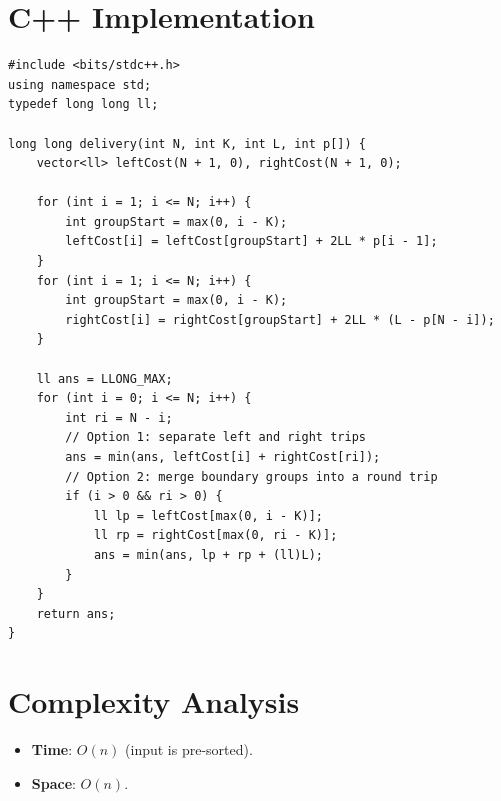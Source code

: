 \documentclass[11pt,a4paper]{article}
\begin{document}
\section{C++ Implementation}

\begin{lstlisting}
#include <bits/stdc++.h>
using namespace std;
typedef long long ll;

long long delivery(int N, int K, int L, int p[]) {
    vector<ll> leftCost(N + 1, 0), rightCost(N + 1, 0);

    for (int i = 1; i <= N; i++) {
        int groupStart = max(0, i - K);
        leftCost[i] = leftCost[groupStart] + 2LL * p[i - 1];
    }
    for (int i = 1; i <= N; i++) {
        int groupStart = max(0, i - K);
        rightCost[i] = rightCost[groupStart] + 2LL * (L - p[N - i]);
    }

    ll ans = LLONG_MAX;
    for (int i = 0; i <= N; i++) {
        int ri = N - i;
        // Option 1: separate left and right trips
        ans = min(ans, leftCost[i] + rightCost[ri]);
        // Option 2: merge boundary groups into a round trip
        if (i > 0 && ri > 0) {
            ll lp = leftCost[max(0, i - K)];
            ll rp = rightCost[max(0, ri - K)];
            ans = min(ans, lp + rp + (ll)L);
        }
    }
    return ans;
}
\end{lstlisting}

\section{Complexity Analysis}

\begin{itemize}
  \item \textbf{Time}: $O(n)$ (input is pre-sorted).
  \item \textbf{Space}: $O(n)$.
\end{itemize}
\end{document}
